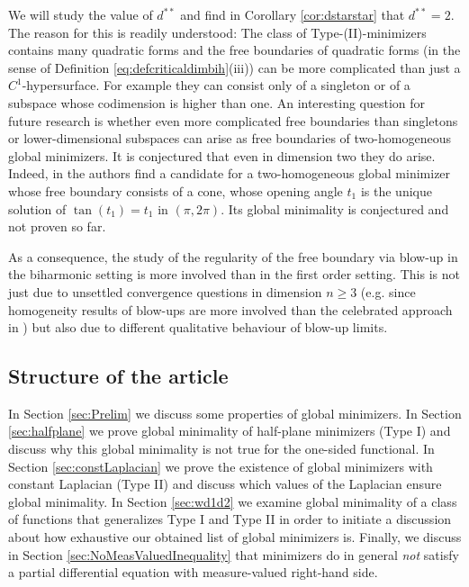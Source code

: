 \documentclass[twoside,11pt]{article}
\theoremstyle{definition}
\begin{document}
We will study the value of $d^{**}$ and find in Corollary \ref{cor:dstarstar} that $d^{**} = 2.$ The reason for this is readily understood: The class of Type-(II)-minimizers contains many quadratic forms and the free boundaries of quadratic forms (in the sense of Definition \ref{eq:defcriticaldimbih}(iii)) can be more complicated than just a $C^1$-hypersurface. For example they can consist only of a singleton or of a subspace whose codimension is higher than one. 
An interesting question for future research is whether even more complicated free boundaries than singletons or lower-dimensional subspaces can arise as free boundaries of two-homogeneous global minimizers. It is conjectured that even in dimension two they do arise. Indeed, in \cite[Eq. (1.8)]{Nahon} the authors find a candidate for a two-homogeneous global minimizer whose free boundary consists of a cone, whose opening angle $t_1$ is the unique solution of $\tan(t_1)=t_1$ in $(\pi,2\pi)$. Its global minimality is conjectured and not proven so far.





As a consequence, the study of the regularity of the free boundary via blow-up in the biharmonic setting is more involved than  in the first order 
 setting. This is not just due to unsettled convergence questions in dimension $n \geq 3 $ (e.g. since homogeneity results of blow-ups are more involved than the celebrated approach in \cite{Weiss})  but also due to different qualitative behaviour of blow-up limits.  

\subsection{Structure of the article}


In Section \ref{sec:Prelim} we discuss some properties of global minimizers. 
In Section \ref{sec:halfplane} we prove global minimality of half-plane minimizers (Type I) and discuss why this global minimality is not true for the one-sided functional. In Section \ref{sec:constLaplacian} we prove the existence of global minimizers with constant Laplacian (Type II) and discuss which values of the Laplacian ensure global minimality.  In Section \ref{sec:wd1d2} we examine global minimality of a class of functions that generalizes Type I and Type II in order to initiate a discussion about how exhaustive our obtained list  of global minimizers is. 
Finally, we discuss in Section \ref{sec:NoMeasValuedInequality} that 
minimizers do in general \emph{not} satisfy a partial differential equation with  measure-valued right-hand side.
\end{document}
